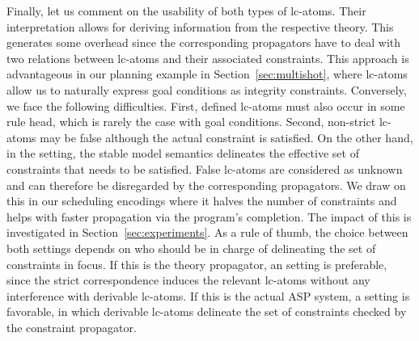 Finally, let us comment on the usability of both types of lc-atoms.
%
Their  interpretation allows for deriving information from the respective theory.
This generates some overhead since the corresponding propagators have to deal with
two relations between lc-atoms and their associated constraints.
%
This approach is advantageous in our planning example in Section~\ref{sec:multishot}, 
where  lc-atoms allow us 
to naturally express goal conditions as integrity constraints.
Conversely, we face the following difficulties.
First, defined lc-atoms must also occur in some rule head, which is rarely the case with goal conditions.
Second, non-strict lc-atoms may be false although the actual constraint is satisfied.
%
On the other hand, 
in the  setting,
the stable model semantics delineates the effective set of constraints that needs to be satisfied.
False lc-atoms are considered as unknown and can therefore be disregarded by the corresponding propagators.
We draw on this in our scheduling encodings where it halves the number of constraints and helps with faster propagation via the program's completion.
The impact of this is investigated in Section~\ref{sec:experiments}.
%
As a rule of thumb,
the choice between both settings depends on who should be in charge of delineating the set of constraints in focus.
If this is the theory propagator, an  setting is preferable,
since the strict correspondence induces the relevant lc-atoms without any interference with derivable lc-atoms.
If this is the actual ASP system, a  setting is favorable,
in which derivable lc-atoms delineate the set of constraints checked by the constraint propagator.
%

